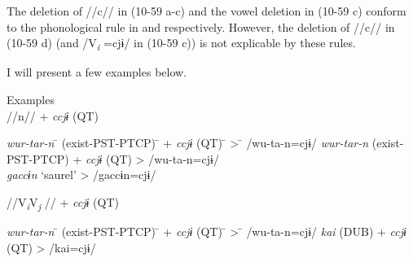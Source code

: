 \begin{xlist}
The deletion of //c// in (10-59 a-c) and the vowel deletion in (10-59 c) conform to the phonological rule in  and  respectively. However, the deletion of //c// in (10-59 d) (and /V\textit{\textsubscript{i} }=cjɨ/ in (10-59 c)) is not explicable by these rules.

I will present a few examples below.

\ea\label{ex:10.60}   Examples\\
  \ea //n// + \textit{ccjɨ} (QT)\\
  \begin{tabbing}
  \textit{wur-tar-n} \hspace{\tabcolsep}\=\hspace{\tabcolsep} (exist-PST-PTCP) \hspace{\tabcolsep}\=\hspace{\tabcolsep} +  \textit{ccjɨ}  (QT) \hspace{\tabcolsep}\=\hspace{\tabcolsep} > \hspace{\tabcolsep}\=\hspace{\tabcolsep} /wu-ta-n=cjɨ/\kill
  \textit{wur-tar-n} \> (exist-PST-PTCP) \> +  \textit{ccjɨ}  (QT) \> > \> /wu-ta-n=cjɨ/\\
  \textit{gaccɨn} \> ‘saurel’  \> \>      > \> /gaccɨn=cjɨ/
  \end{tabbing}

  \ex //V\textit{\textsubscript{i}}V\textit{\textsubscript{j} }// + \textit{ccjɨ} (QT)\\
  \begin{tabbing}
  \textit{wur-tar-n} \hspace{\tabcolsep}\=\hspace{\tabcolsep} (exist-PST-PTCP) \hspace{\tabcolsep}\=\hspace{\tabcolsep} +  \textit{ccjɨ}  (QT) \hspace{\tabcolsep}\=\hspace{\tabcolsep} > \hspace{\tabcolsep}\=\hspace{\tabcolsep} /wu-ta-n=cjɨ/\kill
  \textit{kai} \> (DUB) \> +  \textit{ccjɨ}  (QT) \> > \> /kai=cjɨ/
  \end{tabbing}


\end{xlist}
